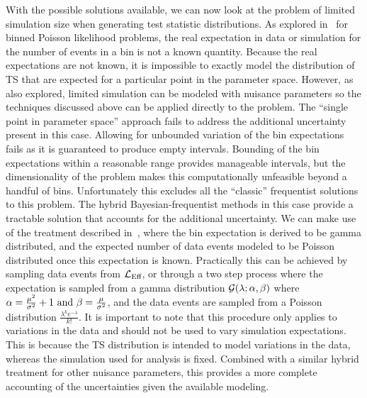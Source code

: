 With the possible solutions available, we can now look at the problem of limited simulation size when generating test statistic distributions.
As explored in~ for binned Poisson likelihood problems, the real expectation in data or simulation for the number of events in a bin is not a known quantity.
Because the real expectations are not known, it is impossible to exactly model the distribution of TS that are expected for a particular point in the parameter space.
However, as~ also explored, limited simulation can be modeled with nuisance parameters so the techniques discussed above can be applied directly to the problem.
The ``single point in parameter space'' approach fails to address the additional uncertainty present in this case.
Allowing for unbounded variation of the bin expectations fails as it is guaranteed to produce empty intervals.
Bounding of the bin expectations within a reasonable range provides manageable intervals, but the dimensionality of the problem makes this computationally unfeasible beyond a handful of bins.
Unfortunately this excludes all the ``classic'' frequentist solutions to this problem.
The hybrid Bayesian-frequentist methods in this case provide a tractable solution that accounts for the additional uncertainty.
We can make use of the treatment described in~, where the bin expectation is derived to be gamma distributed, and the expected number of data events modeled to be Poisson distributed once this expectation is known.
Practically this can be achieved by sampling data events from $\mathcal{L}_\textmd{Eff}$, or through a two step process where the expectation is sampled from a gamma distribution $\mathcal{G}(\lambda;\alpha, \beta)$ where $\alpha = \frac{\mu^2}{\sigma^2}+1~\textmd{and}~\beta=\frac{\mu}{\sigma^2}$, and the data events are sampled from a Poisson distribution $\frac{\lambda^{k}e^{-\lambda}}{k!}$.
It is important to note that this procedure only applies to variations in the data and should not be used to vary simulation expectations.
This is because the TS distribution is intended to model variations in the data, whereas the simulation used for analysis is fixed.
Combined with a similar hybrid treatment for other nuisance parameters, this provides a more complete accounting of the uncertainties given the available modeling.